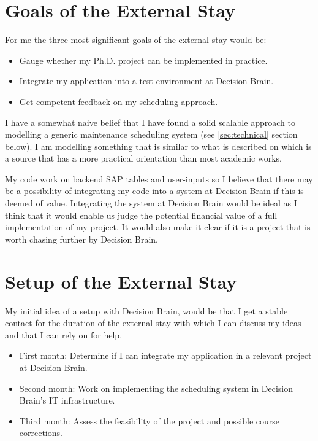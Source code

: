 \section*{Goals of the External Stay}
For me the three most significant goals of the external stay would be:

\begin{itemize}
	\item Gauge whether my Ph.D. project can be implemented in practice. 
	\item Integrate my application into a test environment at Decision Brain.
	\item Get competent feedback on my scheduling approach. 
\end{itemize}

I have a somewhat naive belief that I have found a solid scalable approach to modelling a generic 
maintenance scheduling system (see \ref{sec:technical} section below). I am 
modelling something that is similar to what is described on \cite{palmerMaintenancePlanningScheduling2019} 
which is a source that has a more practical orientation than most academic works. 

My code work on backend SAP tables and user-inputs so I believe that there may be a possibility of integrating my 
code into a system at Decision Brain if this is deemed of value. Integrating the system at Decision 
Brain would be ideal as I think that it would enable us judge the potential financial value 
of a full implementation of my project. It would also make it clear if it is a project that is worth chasing further
by Decision Brain. 

\section*{Setup of the External Stay}
My initial idea of a setup with Decision Brain, would be that I get a stable contact for the duration of the external stay with which
I can discuss my ideas and that I can rely on for help.

\begin{itemize}
	\item First month: Determine if I can integrate my application in a relevant project at Decision Brain.
	\item Second month: Work on implementing the scheduling system in Decision Brain's IT infrastructure.
	\item Third month: Assess the feasibility of the project and possible course corrections.
\end{itemize}
